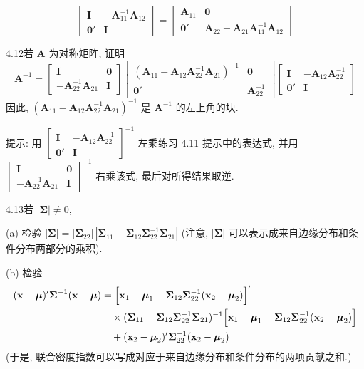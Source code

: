 \[
\begin{bmatrix}\mathbf{I}&-\mathbf{A}_{11}^{-1}\mathbf{A}_{12}\\[4pt]\mathbf{0}'&\mathbf{I}\end{bmatrix}
=\begin{bmatrix}\mathbf{A}_{11}&\mathbf{0}\\[4pt]\mathbf{0}'&\mathbf{A}_{22}-\mathbf{A}_{21}\mathbf{A}_{11}^{-1}\mathbf{A}_{12}\end{bmatrix}
\]

4.12\quad 若 $\mathbf{A}$ 为对称矩阵, 证明
\[
\mathbf{A}^{-1}=\begin{bmatrix}\mathbf{I}&\mathbf{0}\\[4pt]-\mathbf{A}_{22}^{-1}\mathbf{A}_{21}&\mathbf{I}\end{bmatrix}
\begin{bmatrix}(\mathbf{A}_{11}-\mathbf{A}_{12}\mathbf{A}_{22}^{-1}\mathbf{A}_{21})^{-1}&\mathbf{0}\\[4pt]\mathbf{0}'&\mathbf{A}_{22}^{-1}\end{bmatrix}
\begin{bmatrix}\mathbf{I}&-\mathbf{A}_{12}\mathbf{A}_{22}^{-1}\\[4pt]\mathbf{0}'&\mathbf{I}\end{bmatrix}
\]
因此, $(\mathbf{A}_{11}-\mathbf{A}_{12}\mathbf{A}_{22}^{-1}\mathbf{A}_{21})^{-1}$ 是 $\mathbf{A}^{-1}$ 的左上角的块.

提示: 用 $\begin{bmatrix}\mathbf{I}&-\mathbf{A}_{12}\mathbf{A}_{22}^{-1}\\[2pt]\mathbf{0}'&\mathbf{I}\end{bmatrix}^{-1}$ 左乘练习 4.11 提示中的表达式, 并用 $\begin{bmatrix}\mathbf{I}&\mathbf{0}\\[2pt]-\mathbf{A}_{22}^{-1}\mathbf{A}_{21}&\mathbf{I}\end{bmatrix}^{-1}$ 右乘该式, 最后对所得结果取逆.

4.13\quad 若 $|\boldsymbol{\Sigma}|\ne 0$,

(a) 检验 $|\boldsymbol{\Sigma}|=|\boldsymbol{\Sigma}_{22}|\,|\boldsymbol{\Sigma}_{11}-\boldsymbol{\Sigma}_{12}\boldsymbol{\Sigma}_{22}^{-1}\boldsymbol{\Sigma}_{21}|$ (注意, $|\boldsymbol{\Sigma}|$ 可以表示成来自边缘分布和条件分布两部分的乘积).

(b) 检验
\begin{align*}
(\mathbf{x}-\boldsymbol{\mu})'\boldsymbol{\Sigma}^{-1}(\mathbf{x}-\boldsymbol{\mu})
&=\Bigl[\mathbf{x}_{1}-\boldsymbol{\mu}_{1}-\boldsymbol{\Sigma}_{12}\boldsymbol{\Sigma}_{22}^{-1}(\mathbf{x}_{2}-\boldsymbol{\mu}_{2})\Bigr]'\\
&\quad\times(\boldsymbol{\Sigma}_{11}-\boldsymbol{\Sigma}_{12}\boldsymbol{\Sigma}_{22}^{-1}\boldsymbol{\Sigma}_{21})^{-1}\Bigl[\mathbf{x}_{1}-\boldsymbol{\mu}_{1}-\boldsymbol{\Sigma}_{12}\boldsymbol{\Sigma}_{22}^{-1}(\mathbf{x}_{2}-\boldsymbol{\mu}_{2})\Bigr]\\
&\quad+(\mathbf{x}_{2}-\boldsymbol{\mu}_{2})'\boldsymbol{\Sigma}_{22}^{-1}(\mathbf{x}_{2}-\boldsymbol{\mu}_{2})
\end{align*}
(于是, 联合密度指数可以写成对应于来自边缘分布和条件分布的两项贡献之和.)

